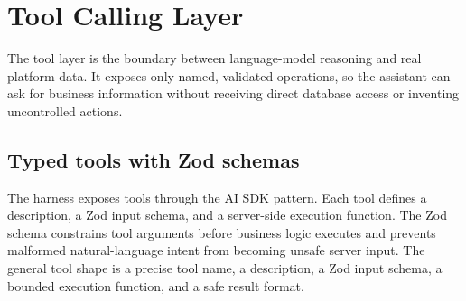 \section{Tool Calling Layer}
The tool layer is the boundary between language-model reasoning and real platform data. It exposes only named, validated operations, so the assistant can ask for business information without receiving direct database access or inventing uncontrolled actions.
\subsection{Typed tools with Zod schemas}
The harness exposes tools through the AI SDK  pattern. Each tool defines a description, a Zod input schema, and a server-side execution function. The Zod schema constrains tool arguments before business logic executes and prevents malformed natural-language intent from becoming unsafe server input. The general tool shape is a precise tool name, a description, a Zod input schema, a bounded execution function, and a safe result format.
